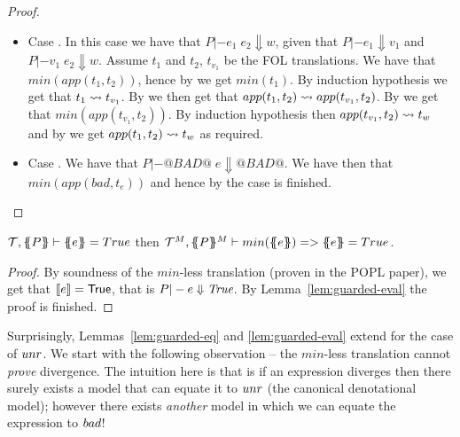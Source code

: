 \documentclass[preprint]{sigplanconf}
\begin{document}
\begin{proof}
\begin{itemize}
\begin{itemize}
    \end{itemize}

  \item Case . In this case we have that $P |- e_1\;e_2 \Downarrow w$, given that 
    $P |- e_1 \Downarrow v_1$ and $P |- v_1\;e_2 \Downarrow w$. Assume $t_1$ and $t_2$, $t_{v_1}$ be the FOL translations.
    We have that $min(app(t_1,t_2))$, hence by  we get $min(t_1)$. By induction hypothesis we get 
    that $t_1 \rightsquigarrow t_{v_1}$. By  we then get that $app(t_1,t_2) \rightsquigarrow app(t_{v_1},t_2)$. By 
    we get that $min(app(t_{v_1},t_2))$. By induction hypothesis then $app(t_{v_1},t_2) \rightsquigarrow t_w$ and by 
    we get $app(t_1,t_2) \rightsquigarrow t_w$ as required.

  \item Case . We have that $P |- @BAD@\;e \Downarrow @BAD@$. We have 
        then that $min(app(bad,t_e))$ and hence by  the case is finished.
\end{itemize} 
\end{proof}

\begin{lemma}[Guarded-Eq]\label{lem:guarded-eq}
   $\Th , \ptrans{}{P} \vdash \etrans{}{}{e} = True$ then
   $\Th^M , \ptrans{}{P}^M \vdash min(\etrans{}{}{e}) => \etrans{}{}{e} = True$.
\end{lemma}
\begin{proof}
By soundness of the $min$-less translation (proven in the POPL paper), we 
get that $[\![e]\!] = \mathsf{True}$, that is $P |- e \Downarrow \textit{True}$. 
By Lemma~\ref{lem:guarded-eval} the proof is finished.
\end{proof}


Surprisingly, Lemmas~\ref{lem:guarded-eq} and \ref{lem:guarded-eval} extend for the case of $\mathop{unr}$.
We start with the following observation -- the $min$-less translation cannot {\em prove} divergence.
The intuition here is that is if an expression diverges then there surely exists a model that can 
equate it to $\mathop{unr}$ (the canonical denotational model); however there exists {\em another} model
in which we can equate the expression to $\mathop{bad}$!
\end{document}
